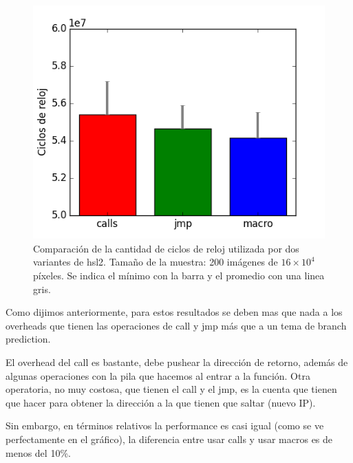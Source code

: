 \begin{figure}[H] 
	\centering
  \includegraphics[scale=0.7]{images/hsl-jmpcall.png}
  \caption{Comparación de la cantidad de ciclos de reloj utilizada por dos variantes de hsl2. Tamaño de la muestra: 200 imágenes de $16 \times 10^4$ píxeles. Se indica el mínimo con la barra y el promedio con una linea gris.}
\end{figure}

Como dijimos anteriormente, para estos resultados se deben mas que nada a los overheads que tienen las operaciones de call y jmp más que a un tema de branch prediction.

El overhead del call es bastante, debe pushear la dirección de retorno, además de algunas operaciones con la pila que hacemos al entrar a la función. Otra operatoria, no muy costosa, que tienen el call y el jmp, es la cuenta que tienen que hacer para obtener la dirección a la que tienen que saltar (nuevo IP).

Sin embargo, en términos relativos la performance es casi igual (como se ve perfectamente en el gráfico), la diferencia entre usar calls y usar macros es de menos del 10\%.


